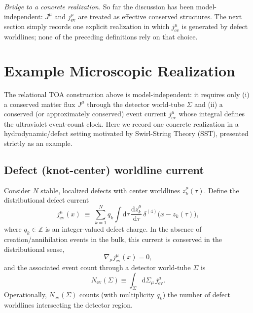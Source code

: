 \documentclass[pdflatex,sn-mathphys-num]{sn-jnl}
\theoremstyle{thmstylethree}
\theoremstyle{thmstyleone}
\theoremstyle{thmstyletwo}
\numberwithin{equation}{section}
\newcommand{\dd}{\mathrm{d}}
\begin{document}
    \medskip
    \noindent
    \textit{Bridge to a concrete realization.}
    So far the discussion has been model-independent: $J^\mu$ and $j^\mu_{\mathrm{ev}}$ are treated as effective conserved structures. The next section simply records one explicit realization in which $j^\mu_{\mathrm{ev}}$ is generated by defect worldlines; none of the preceding definitions rely on that choice.

    \section{Example Microscopic Realization}
    \label{sec:SSTrealization}
    
    The relational TOA construction above is model-independent: it requires only (i) a conserved matter flux $J^\mu$ through the detector world-tube $\Sigma$ and (ii) a conserved (or approximately conserved) event current $j^\mu_{\mathrm{ev}}$ whose integral defines the ultraviolet event-count clock. Here we record one concrete realization in a hydrodynamic/defect setting motivated by Swirl-String Theory (SST), presented strictly as an example.
    
    \subsection{Defect (knot-center) worldline current}
        
        Consider $N$ stable, localized defects with center worldlines $z_k^\mu(\tau)$. Define the distributional defect current
        \begin{equation}
            j^\mu_{\mathrm{ev}}(x)
            \;\equiv\;
            \sum_{k=1}^{N} q_k \int \dd\tau\,
            \frac{\dd z_k^\mu}{\dd\tau}\,
            \delta^{(4)}\!\big(x-z_k(\tau)\big),
            \label{eq:defectCurrent}
        \end{equation}
        where $q_k\in\mathbb{Z}$ is an integer-valued defect charge. In the absence of creation/annihilation events in the bulk, this current is conserved in the distributional sense,
        \begin{equation}
            \nabla_\mu j^\mu_{\mathrm{ev}}(x)=0,
        \end{equation}
        and the associated event count through a detector world-tube $\Sigma$ is
        \begin{equation}
            N_{\mathrm{ev}}(\Sigma)\equiv\int_{\Sigma}\dd\Sigma_\mu\, j^\mu_{\mathrm{ev}}.
        \end{equation}
        Operationally, $N_{\mathrm{ev}}(\Sigma)$ counts (with multiplicity $q_k$) the number of defect worldlines intersecting the detector region.
    
\end{document}
